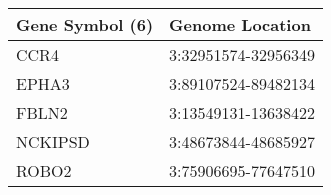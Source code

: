 \begin{tabular}{ll}
\toprule
Gene Symbol (6) &     Genome Location \\
\midrule
           CCR4 & 3:32951574-32956349 \\
          EPHA3 & 3:89107524-89482134 \\
          FBLN2 & 3:13549131-13638422 \\
        NCKIPSD & 3:48673844-48685927 \\
          ROBO2 & 3:75906695-77647510 \\
\bottomrule
\end{tabular}
